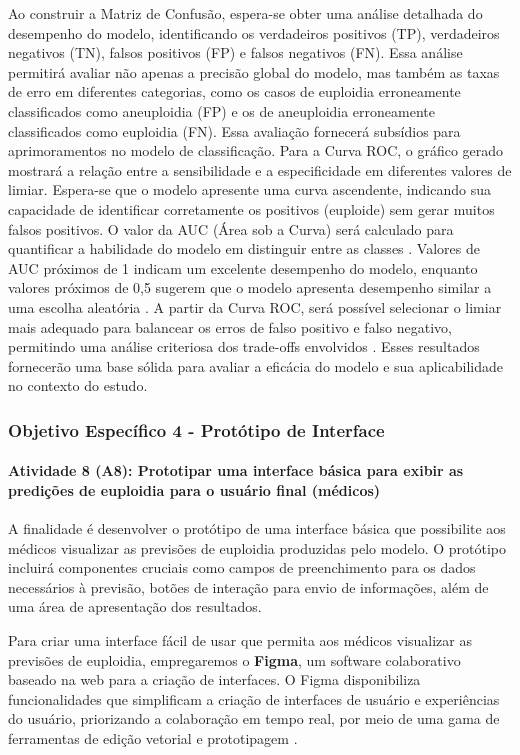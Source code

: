 Ao construir a Matriz de Confusão, espera-se obter uma análise detalhada do desempenho do modelo, identificando os verdadeiros positivos (TP), verdadeiros negativos (TN), falsos positivos (FP) e falsos negativos (FN). Essa análise permitirá avaliar não apenas a precisão global do modelo, mas também as taxas de erro em diferentes categorias, como os casos de euploidia erroneamente classificados como aneuploidia (FP) e os de aneuploidia erroneamente classificados como euploidia (FN). Essa avaliação fornecerá subsídios para aprimoramentos no modelo de classificação. Para a Curva ROC, o gráfico gerado mostrará a relação entre a sensibilidade e a especificidade em diferentes valores de limiar. Espera-se que o modelo apresente uma curva ascendente, indicando sua capacidade de identificar corretamente os positivos (euploide) sem gerar muitos falsos positivos. O valor da AUC (Área sob a Curva) será calculado para quantificar a habilidade do modelo em distinguir entre as classes \cite{vilela2022}. Valores de AUC próximos de 1 indicam um excelente desempenho do modelo, enquanto valores próximos de 0,5 sugerem que o modelo apresenta desempenho similar a uma escolha aleatória \cite{vilela2022}. A partir da Curva ROC, será possível selecionar o limiar mais adequado para balancear os erros de falso positivo e falso negativo, permitindo uma análise criteriosa dos trade-offs envolvidos \cite{vilela2022}. Esses resultados fornecerão uma base sólida para avaliar a eficácia do modelo e sua aplicabilidade no contexto do estudo.

\subsubsection{\textbf{Objetivo Específico 4} - Protótipo de Interface}

\paragraph{\textbf{Atividade 8 (A8):} Prototipar uma interface básica para exibir as predições de euploidia para o usuário final (médicos)}

A finalidade é desenvolver o protótipo de uma interface básica que possibilite aos médicos visualizar as previsões de euploidia produzidas pelo modelo. O protótipo incluirá componentes cruciais como campos de preenchimento para os dados necessários à previsão, botões de interação para envio de informações, além de uma área de apresentação dos resultados.

Para criar uma interface fácil de usar que permita aos médicos visualizar as previsões de euploidia, empregaremos o  \textbf{Figma}, um software colaborativo baseado na web para a criação de interfaces. O Figma disponibiliza funcionalidades que simplificam a criação de interfaces de usuário e experiências do usuário, priorizando a colaboração em tempo real, por meio de uma gama de ferramentas de edição vetorial e prototipagem \cite{figma2024}.

